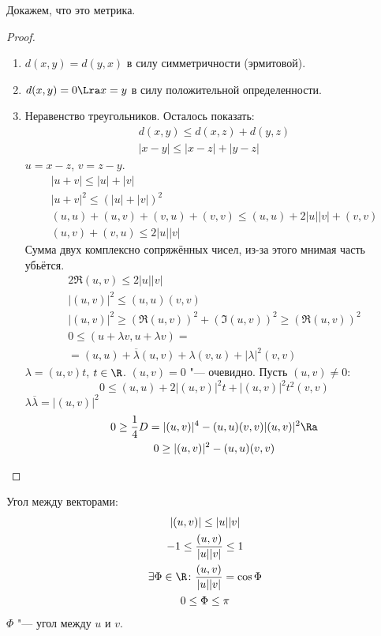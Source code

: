 Докажем, что это метрика.
\begin{proof}
        \begin{enumerate}
	\item
	$d(x, y) = d(y, x)$ в силу симметричности (эрмитовой). 
	\item
	$d(x, y) = 0 \Lra x = y$ в силу положительной определенности. 
	\item Неравенство треугольников.
	Осталось показать:
	\begin{gather*}
		d(x, y) \le d(x, z) + d(y, z) \\
		|x - y| \le |x - z| + |y - z|
	\end{gather*}
	$u = x - z$, $v = z - y$.
	\begin{gather*}
		|u + v| \le |u| + |v| \\
		|u + v|^2 \le (|u| + |v|)^2 \\
		(u, u) + (u, v) + (v, u) + (v, v) \le (u, u) + 2|u||v| + (v, v) \\
		(u, v) + (v, u) \le 2|u||v|
	\end{gather*}
	Сумма двух комплексно сопряжённых чисел, из-за этого мнимая часть убьётся.
	\begin{gather*}
		2\Re(u, v) \le 2|u||v| \\
		|(u, v)|^2 \le (u, u)(v, v) \\
		|(u, v)|^2 \ge (\Re(u, v))^2 + (\Im(u, v))^2 \ge (\Re(u,v))^2 \\
		0 \le (u + \lambda v, u + \lambda v) =  \\
		= (u, u) + \overline{\lambda}(u, v) + \lambda(v, u) + |\lambda|^2(v, v)
	\end{gather*}
	$\lambda = (u, v)t$, $t \in \R$.
	$(u, v) = 0$ "--- очевидно.
	Пусть $(u, v) \ne 0$:
	\[
		0 \le (u, u) + 2|(u, v)|^2t + |(u, v)|^2t^2(v, v)
	\]
	$\lambda\overline{\lambda} = |(u, v)|^2$
	\begin{gather*}
		0 \ge \frac{1}{4}D = |(u,v)|^4 - (u, u)(v, v)|(u, v)|^2 \Ra \\
		0 \ge |(u, v)|^2 - (u, u)(v, v)
	\end{gather*}
	\end{enumerate}
\end{proof}

\begin{Def}
	Угол между векторами:
	\begin{gather*}
		|(u, v)| \le |u||v| \\
		-1 \le \frac{(u, v)}{|u||v|} \le 1 \\
		\exists \Phi \in \R\colon \frac{(u,v)}{|u||v|} = \cos \Phi \\
		0 \le \Phi \le \pi
	\end{gather*}
	$\Phi$ "--- угол между $u$ и $v$.
\end{Def}
